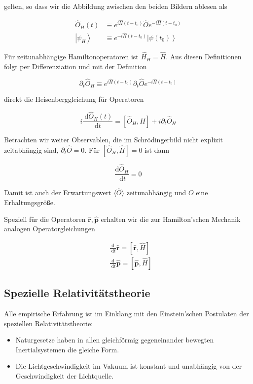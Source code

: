 \documentclass[10pt, letterpaper]{article}
\begin{document}
gelten, so dass wir die Abbildung zwischen den beiden Bildern ablesen als

$$
\begin{aligned}
\hat{O}_{H}(t) & \equiv e^{i \hat{H}\left(t-t_{0}\right)} \hat{O} e^{-i \hat{H}\left(t-t_{0}\right)} \\
\left|\psi_{H}\right\rangle & \equiv e^{-i \hat{H}\left(t-t_{0}\right)}\left|\psi\left(t_{0}\right)\right\rangle
\end{aligned}
$$

Für zeitunabhängige Hamiltonoperatoren ist $\hat{H}_{H}=\hat{H}$. Aus diesen Definitionen folgt per Differenziation und mit der Definition

$$
\partial_{t} \hat{O}_{H} \equiv e^{i \hat{H}\left(t-t_{0}\right)} \partial_{t} \hat{O} e^{-i \hat{H}\left(t-t_{0}\right)}
$$

direkt die Heisenberggleichung für Operatoren

$$
i \frac{\mathrm{~d} \hat{O}_{H}(t)}{\mathrm{d} t}=\left[\hat{O}_{H}, H\right]+i \partial_{t} \hat{O}_{H}
$$

Betrachten wir weiter Observablen, die im Schrödingerbild nicht explizit zeitabhängig sind, $\partial_{t} \hat{O}=0$. Für $\left[\hat{O}_{H}, \hat{H}\right]=0$ ist dann

$$
\frac{\mathrm{d} \hat{O}_{H}}{\mathrm{~d} t}=0
$$

Damit ist auch der Erwartungswert $\langle\hat{O}\rangle$ zeitunabhängig und $O$ eine Erhaltungsgröße.

Speziell für die Operatoren $\hat{\mathbf{r}}, \hat{\mathbf{p}}$ erhalten wir die zur Hamilton'schen Mechanik analogen Operatorgleichungen

$$
\begin{aligned}
& \frac{\mathrm{d}}{\mathrm{~d} t} \hat{\mathbf{r}}=[\hat{\mathbf{r}}, \hat{H}] \\
& \frac{\mathrm{d}}{\mathrm{~d} t} \hat{\mathbf{p}}=[\hat{\mathbf{p}}, \hat{H}]
\end{aligned}
$$

\subsection{Spezielle Relativitätstheorie}
Alle empirische Erfahrung ist im Einklang mit den Einstein'schen Postulaten der speziellen Relativitätstheorie:

\begin{itemize}
  \item Naturgesetze haben in allen gleichförmig gegeneinander bewegten Inertialsystemen die gleiche Form.
  \item Die Lichtgeschwindigkeit im Vakuum ist konstant und unabhängig von der Geschwindigkeit der Lichtquelle.
\end{itemize}
\end{document}
